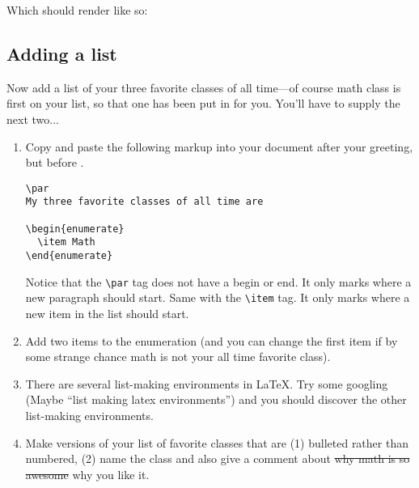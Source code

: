 \clearpage

Which should render like so:


\begin{center}
\end{center}


\subsection*{Adding a list}

Now add a list of your three favorite classes of all time---of course
math class is first on your list, so that one has been put in for
you. You'll have to supply the next two...

\begin{enumerate}

\item Copy and paste the following markup into your document 
after your greeting, but before \verb++.
\bigskip

\begin{codeblock}
\begin{verbatim}
\par
My three favorite classes of all time are

\begin{enumerate}
  \item Math
\end{enumerate}
\end{verbatim}
\end{codeblock}
\bigskip

Notice that the \verb+\par+ tag does not have a begin
or end. It only marks where a new paragraph should start. Same with
the \verb+\item+ tag. It only marks where a new item
in the list should start.
\item Add two items to the enumeration (and you can change the first item
if by some strange chance math is not your all time favorite class).
\item There are several list-making environments in \LaTeX.  Try some googling (Maybe ``list making latex environments'') 
and you should discover the other list-making environments.
\item Make versions of your list of favorite classes that are (1) bulleted rather than numbered, (2) name the class and also give a comment about \sout{why math is so awesome} why you like it.

\end{enumerate}

